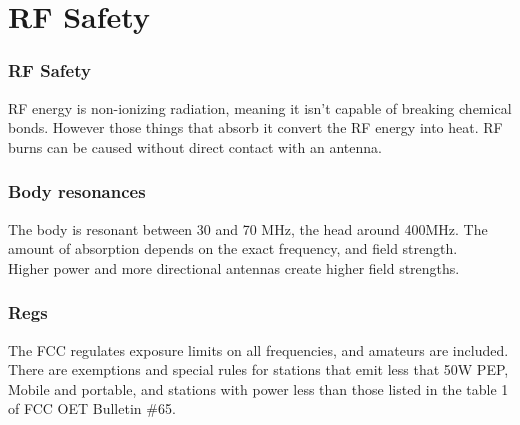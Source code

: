 \documentclass[10pt, handout]{beamer}
\begin{document}
\section{RF Safety}

\begin{frame}
\frametitle{RF Safety}
RF energy is non-ionizing radiation, meaning it isn't capable of breaking chemical bonds. However those things that absorb it convert the RF energy into heat. RF burns can be caused without direct contact with an antenna.
\end{frame}

\begin{frame}
\frametitle{Body resonances}
The body is resonant between 30 and 70 MHz, the head around 400MHz. The amount of absorption depends on the exact frequency, and field strength.\\
Higher power and more directional antennas create higher field strengths.
\end{frame}

\begin{frame}
\frametitle{Regs}
The FCC regulates exposure limits on all frequencies, and amateurs are included.\\
There are exemptions and special rules for stations that emit less that 50W PEP, Mobile and portable, and stations with power less than those listed in the table 1 of FCC OET Bulletin \#65.
\end{frame}
\end{document}
